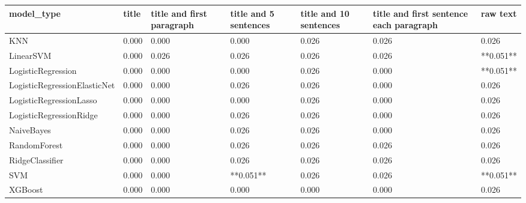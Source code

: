 \begin{tabular}{lllllll}
\toprule
                  model\_type & title & title and first paragraph & title and 5 sentences & title and 10 sentences & title and first sentence each paragraph &  raw text \\
\midrule
                         KNN & 0.000 &                     0.000 &                 0.000 &                  0.026 &                                   0.026 &     0.026 \\
                   LinearSVM & 0.000 &                     0.026 &                 0.026 &                  0.026 &                                   0.026 & **0.051** \\
          LogisticRegression & 0.000 &                     0.000 &                 0.000 &                  0.026 &                                   0.000 & **0.051** \\
LogisticRegressionElasticNet & 0.000 &                     0.000 &                 0.026 &                  0.026 &                                   0.000 &     0.026 \\
     LogisticRegressionLasso & 0.000 &                     0.000 &                 0.000 &                  0.026 &                                   0.000 &     0.026 \\
     LogisticRegressionRidge & 0.000 &                     0.000 &                 0.026 &                  0.026 &                                   0.000 &     0.026 \\
                  NaiveBayes & 0.000 &                     0.000 &                 0.026 &                  0.026 &                                   0.000 &     0.026 \\
                RandomForest & 0.000 &                     0.000 &                 0.026 &                  0.026 &                                   0.026 &     0.026 \\
             RidgeClassifier & 0.000 &                     0.000 &                 0.026 &                  0.026 &                                   0.026 &     0.026 \\
                         SVM & 0.000 &                     0.000 &             **0.051** &                  0.026 &                                   0.026 & **0.051** \\
                     XGBoost & 0.000 &                     0.000 &                 0.000 &                  0.000 &                                   0.000 &     0.026 \\
\bottomrule
\end{tabular}
